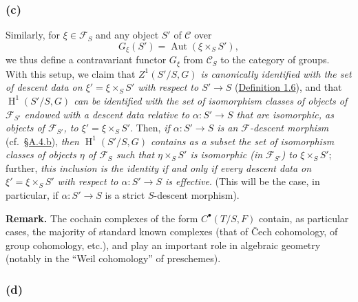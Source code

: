 \documentclass{article}
\newenvironment{rmenv}[1]
  {\phantomsection\par\smallskip\noindent\textbf{#1.}\rmfamily}
  {\par\smallskip}
\newcommand{\oldpage}[1]{\marginpar{\footnotesize$\Big\vert$ \textit{p.~#1}}}
\theoremstyle{definition}
\theoremstyle{definition}
\theoremstyle{definition}
\theoremstyle{definition}
\theoremstyle{remark}
\begin{document}
\hypertarget{fga-3-i-section-A.4.c}{%
\subsubsection{(c)}\label{fga-3-i-section-A.4.c}}

Similarly, for \(\xi\in{\mathcal{F}}_S\) and any object \(S'\) of \({\mathcal{C}}\) over
\[
  G_\xi(S') = \operatorname{Aut}(\xi\times_S S'),
\]
we thus define a contravariant functor \(G_\xi\) from \({\mathcal{C}}_S\) to the category of groups.
\oldpage{190-14}With this setup, we claim that \emph{\(Z^1(S'/S,G)\) is canonically identified with the set of descent data on \(\xi'=\xi\times_S S'\) with respect to \(S'\to S\)} (\protect\hyperlink{fga-3-i-section-A.1-definition-1.6}{Definition 1.6}), and that \emph{\(\operatorname{H}^1(S'/S,G)\) can be identified with the set of isomorphism classes of objects of \({\mathcal{F}}_{S'}\) endowed with a descent data relative to \(\alpha\colon S'\to S\) that are isomorphic, as objects of \({\mathcal{F}}_{S'}\), to \(\xi'=\xi\times_S S'\)}.
Then, \emph{if \(\alpha\colon S'\to S\) is an \({\mathcal{F}}\)-descent morphism} (cf.~\protect\hyperlink{fga-3-i-section-A.4.b}{§A.4.b}), \emph{then \(\operatorname{H}^1(S'/S,G)\) contains as a subset the set of isomorphism classes of objects \(\eta\) of \({\mathcal{F}}_S\) such that \(\eta\times_S S'\) is isomorphic (in \({\mathcal{F}}_{S'}\)) to \(\xi\times_S S'\)};
further, \emph{this inclusion is the identity if and only if every descent data on \(\xi'=\xi\times_S S'\) with respect to \(\alpha\colon S'\to S\) is effective}.
(This will be the case, in particular, if \(\alpha\colon S'\to S\) is a strict \(S\)-descent morphism).

\begin{rmenv}{Remark}
The cochain complexes of the form \(C^\bullet(T/S,F)\) contain, as particular cases, the majority of standard known complexes (that of Čech cohomology, of group cohomology, etc.), and play an important role in algebraic geometry (notably in the ``Weil cohomology'' of preschemes).

\end{rmenv}

\hypertarget{fga-3-i-section-A.4.d}{%
\subsubsection{(d)}\label{fga-3-i-section-A.4.d}}
\end{document}
